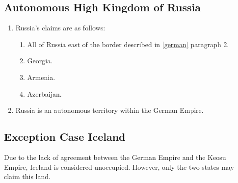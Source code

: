 \documentclass{article}
\begin{document}
\subsection{Autonomous High Kingdom of Russia}
\begin{enumerate}[(1)]
    \item Russia's claims are as follows:
    \begin{enumerate}[1.]
        \item All of Russia east of the border described in \ref{german} paragraph 2.
        \item Georgia.
        \item Armenia.
        \item Azerbaijan.
    \end{enumerate}
    \item Russia is an autonomous territory within the German Empire.
\end{enumerate}

\subsection{Exception Case Iceland}
Due to the lack of agreement between the German Empire and the Keosu Empire, Iceland is considered unoccupied. However, only the two states may claim this land.
\end{document}
